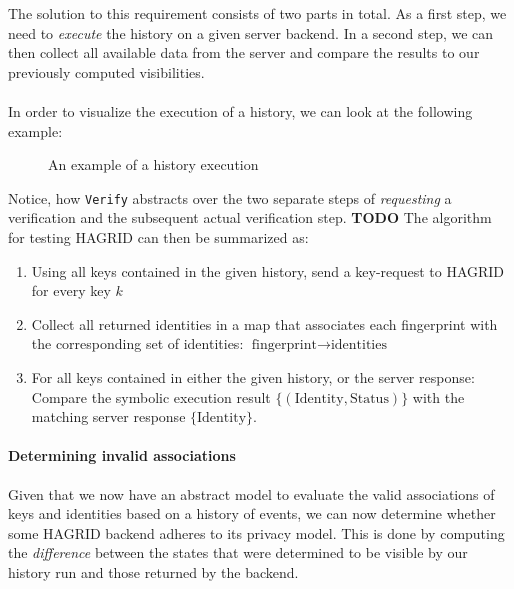 The solution to this requirement consists of two parts in total. As a first step, we need to \emph{execute} the history on a given server backend. In a second step, we can then collect all available data from the server and compare the results to our previously computed visibilities. 
\\ \\
In order to visualize the execution of a history, we can look at the following example: 
\begin{figure}[H]
    \label{fig:history}
    \centering
    \caption{An example of a history execution}
\end{figure}


Notice, how \texttt{Verify} abstracts over the two separate steps of \emph{requesting} a verification and the subsequent actual verification step.
\textbf{TODO}
The algorithm for testing HAGRID can then be summarized as: 
\begin{enumerate}
    \item Using all keys contained in the given history, send a key-request to HAGRID for every key $k$
    \item Collect all returned identities in a map that associates each fingerprint with the corresponding set of identities: $ \text{fingerprint} \rightarrow \text{identities}$
    \item\label{sec:comp_hagrid} For all keys contained in either the given history, or the server response: Compare the symbolic execution result $\{(\text{Identity},\text{Status})\}$ with the matching server response $\{\text{Identity}\}$.
\end{enumerate}

\paragraph{Determining invalid associations}
Given that we now have an abstract model to evaluate the valid associations of keys and identities based on a history of events, we can now determine whether some HAGRID backend adheres to its privacy model. This is done by computing the \emph{difference} between the states that were determined to be visible by our history run and those returned by the backend.


